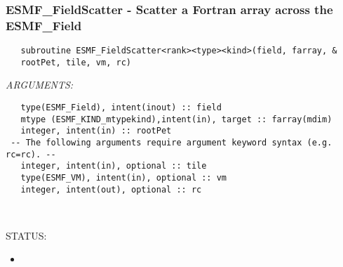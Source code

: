  
\setlength{\oldparskip}{\parskip}
\setlength{\parskip}{1.5ex}
\setlength{\oldparindent}{\parindent}
\setlength{\parindent}{0pt}
\setlength{\oldbaselineskip}{\baselineskip}
\setlength{\baselineskip}{11pt}
 
\def\bv{\begin{verbatim}}
\def\ev{\end{verbatim}}
\def\be{\begin{equation}}
\def\ee{\end{equation}}
\def\bea{\begin{eqnarray}}
\def\eea{\end{eqnarray}}
\def\bi{\begin{itemize}}
\def\ei{\end{itemize}}
\def\bn{\begin{enumerate}}
\def\en{\end{enumerate}}
\def\bd{\begin{description}}
\def\ed{\end{description}}
\def\({\left (}
\def\){\right )}
\def\[{\left [}
\def\]{\right ]}
\def\<{\left  \langle}
\def\>{\right \rangle}
\def\cI{{\cal I}}
\def\diag{\mathop{\rm diag}}
\def\tr{\mathop{\rm tr}}


 

   \subsubsection [ESMF\_FieldScatter] {ESMF\_FieldScatter - Scatter a Fortran array across the ESMF\_Field }


   
\begin{verbatim}   subroutine ESMF_FieldScatter<rank><type><kind>(field, farray, & 
   rootPet, tile, vm, rc) 
   \end{verbatim}{\em ARGUMENTS:}
\begin{verbatim}   type(ESMF_Field), intent(inout) :: field 
   mtype (ESMF_KIND_mtypekind),intent(in), target :: farray(mdim) 
   integer, intent(in) :: rootPet 
 -- The following arguments require argument keyword syntax (e.g. rc=rc). --
   integer, intent(in), optional :: tile 
   type(ESMF_VM), intent(in), optional :: vm 
   integer, intent(out), optional :: rc 
   
   
   \end{verbatim}
{\sf STATUS:}
   \begin{itemize} 
   \item{} 
   \end{itemize} 
   
